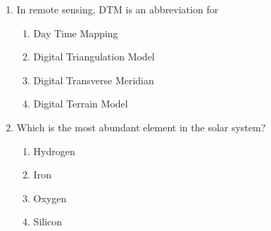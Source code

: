 \documentclass[journal,12pt,onecolumn]{IEEEtran}
\theoremstyle{remark}
\begin{document}
\begin{enumerate}
\item In remote sensing, DTM is an abbreviation for
\begin{multicols}{2}
\begin{enumerate}
\item Day Time Mapping
\item Digital Triangulation Model
\item Digital Transverse Meridian
\item Digital Terrain Model
\end{enumerate}
\end{multicols}
\vspace{0.5cm}

\item Which is the most abundant element in the solar system?
\begin{multicols}{4}
\begin{enumerate}
\item Hydrogen
\item Iron
\item Oxygen
\item Silicon
\end{enumerate}
\end{multicols}
\vspace{0.5cm}

\end{enumerate}
\end{document}
